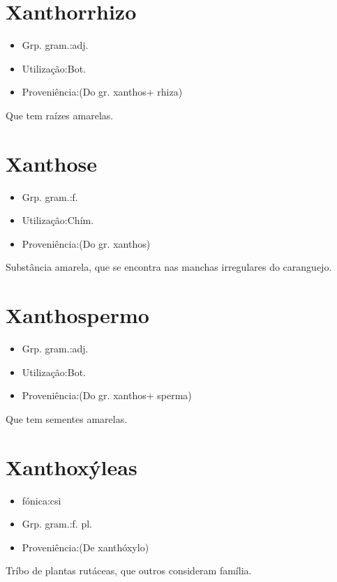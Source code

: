 \section{Xanthorrhizo}
\begin{itemize}
\item {Grp. gram.:adj.}
\end{itemize}
\begin{itemize}
\item {Utilização:Bot.}
\end{itemize}
\begin{itemize}
\item {Proveniência:(Do gr. \textunderscore xanthos\textunderscore  + \textunderscore rhiza\textunderscore )}
\end{itemize}
Que tem raízes amarelas.
\section{Xanthose}
\begin{itemize}
\item {Grp. gram.:f.}
\end{itemize}
\begin{itemize}
\item {Utilização:Chím.}
\end{itemize}
\begin{itemize}
\item {Proveniência:(Do gr. \textunderscore xanthos\textunderscore )}
\end{itemize}
Substância amarela, que se encontra nas manchas irregulares do caranguejo.
\section{Xanthospermo}
\begin{itemize}
\item {Grp. gram.:adj.}
\end{itemize}
\begin{itemize}
\item {Utilização:Bot.}
\end{itemize}
\begin{itemize}
\item {Proveniência:(Do gr. \textunderscore xanthos\textunderscore  + \textunderscore sperma\textunderscore )}
\end{itemize}
Que tem sementes amarelas.
\section{Xanthoxýleas}
\begin{itemize}
\item {fónica:csi}
\end{itemize}
\begin{itemize}
\item {Grp. gram.:f. pl.}
\end{itemize}
\begin{itemize}
\item {Proveniência:(De \textunderscore xanthóxylo\textunderscore )}
\end{itemize}
Tríbo de plantas rutáceas, que outros consideram família.
